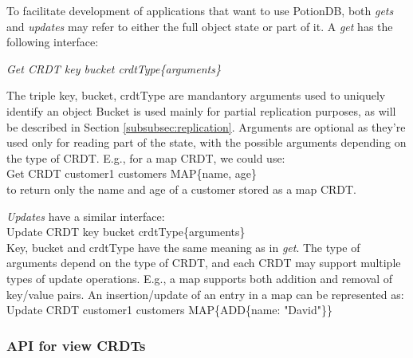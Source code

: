 \documentclass{vldb}
\newcommand{\lineemph}[1]{\vspace{\baselineskip}\hspace{2em}\emph{#1}\vspace{\baselineskip}}
\begin{document}
To facilitate development of applications that want to use PotionDB, both \emph{gets} and \emph{updates} may refer to either the full object state or part of it.
A \emph{get} has the following interface: %

\lineemph{Get CRDT key bucket crdtType\{arguments\}}

The triple key, bucket, crdtType are mandantory arguments used to uniquely identify an object
Bucket is used mainly for partial replication purposes, as will be described in Section \ref{subsubsec:replication}. 
Arguments are optional as they're used only for reading part of the state, with the possible arguments depending on the type of CRDT. 
E.g., for a map CRDT, we could use: \\

Get CRDT customer1 customers MAP\{name, age\}\\

to return only the name and age of a customer stored as a map CRDT.

\emph{Updates} have a similar interface: \\

Update CRDT key bucket crdtType\{arguments\} \\

Key, bucket and crdtType have the same meaning as in \emph{get}.
The type of arguments depend on the type of CRDT, and each CRDT may support multiple types of update operations. 
E.g., a map supports both addition and removal of key/value pairs.
An insertion/update of an entry in a map can be represented as: \\

Update CRDT customer1 customers MAP\{ADD\{name: "David"\}\} \\

\subsubsection{API for view CRDTs}
\label{subsubsec:APIView}
\end{document}
